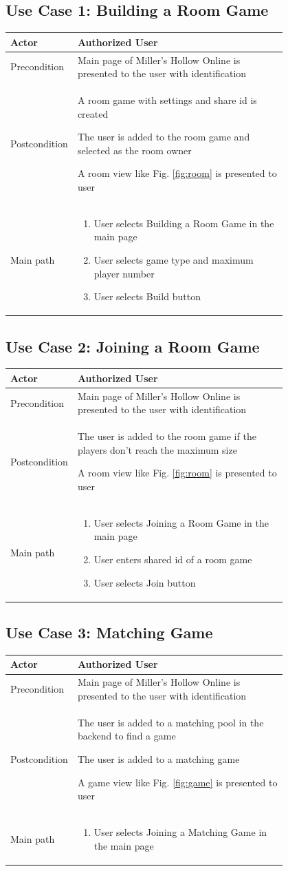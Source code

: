 \documentclass[11pt]{article}
\newcommand\addrow[2]{#1 &#2\\ }
\newcommand\addheading[2]{#1 &#2\\ \hline}
\newcommand\tabularhead{\begin{tabular}{lp{0.8\linewidth}}
\hline
}
\newcommand\addmulrow[2]{\begin{minipage}[t][][t]{2.5cm}#1\end{minipage}%
   &\begin{minipage}[t][][t]{0.8\linewidth}
    \begin{enumerate} #2   \end{enumerate}
    \end{minipage}\\ }
\newenvironment{usecase}{\tabularhead}
{\hline\end{tabular}}
\begin{document}
\subsection{Use Case 1: Building a Room Game}
\begin{usecase}
\addheading{Actor}{Authorized User} 
\addrow{Precondition}{Main page of Miller's Hollow Online is presented to the user with identification}
\addrow{Postcondition}{
A room game with settings and share id is created

The user is added to the room game and selected as the room owner

A room view like Fig. \ref{fig:room} is presented to user
}
\addmulrow{Main path}{
\item User selects Building a Room Game in the main page
\item User selects game type and maximum player number
\item User selects Build button
}
\end{usecase}

\subsection{Use Case 2: Joining a Room Game}
\begin{usecase}
\addheading{Actor}{Authorized User} 
\addrow{Precondition}{Main page of Miller's Hollow Online is presented to the user with identification}
\addrow{Postcondition}{
The user is added to the room game if the players don't reach the maximum size

A room view like Fig. \ref{fig:room} is presented to user
}
\addmulrow{Main path}{
\item User selects Joining a Room Game in the main page
\item User enters shared id of a room game
\item User selects Join button
}
\end{usecase}

\subsection{Use Case 3: Matching Game}
\begin{usecase}
\addheading{Actor}{Authorized User} 
\addrow{Precondition}{Main page of Miller's Hollow Online is presented to the user with identification}
\addrow{Postcondition}{
The user is added to a matching pool in the backend to find a game

The user is added to a matching game

A game view like Fig. \ref{fig:game} is presented to user
}
\addmulrow{Main path}{
\item User selects Joining a Matching Game in the main page
}
\end{usecase}
\end{document}
